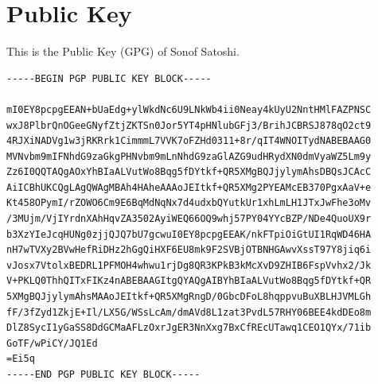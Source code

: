 \documentclass{article}
\begin{document}
\section{Public Key}
This is the Public Key (GPG) of Sonof Satoshi.
\label{gpgkey}
\begin{small}
\begin{verbatim}
-----BEGIN PGP PUBLIC KEY BLOCK-----

mI0EY8pcpgEEAN+bUaEdg+ylWkdNc6U9LNkWb4ii0Neay4kUyU2NntHMlFAZPNSC
wxJ8PlbrQnOGeeGNyfZtjZKTSn0Jor5YT4pHNlubGFj3/BrihJCBRSJ878qO2ct9
4RJXiNADVg1w3jRKRrk1CimmmL7VVK7oFZHd0311+8r/qIT4WNOITydNABEBAAG0
MVNvbm9mIFNhdG9zaGkgPHNvbm9mLnNhdG9zaGlAZG9udHRydXN0dmVyaWZ5Lm9y
Zz6I0QQTAQgAOxYhBIaALVutWo8Bqg5fDYtkf+QR5XMgBQJjylymAhsDBQsJCAcC
AiICBhUKCQgLAgQWAgMBAh4HAheAAAoJEItkf+QR5XMg2PYEAMcEB370PgxAaV+e
Kt458OPymI/rZOWO6Cm9E6BqMdNqNx7d4udxbQYutkUr1xhLmLH1JTxJwFhe3oMv
/3MUjm/VjIYrdnXAhHqvZA3502AyiWEQ66OQ9whj57PY04YYcBZP/NDe4QuoUX9r
b3XzYIeJcqHUNg0zjjQJQ7bU7gcwuI0EY8pcpgEEAK/nkFTpiOiGtUI1RqWD46HA
nH7wTVXy2BVwHefRiDHz2hGgQiHXF6EU8mk9F2SVBjOTBNHGAwvXssT97Y8jiq6i
vJosx7VtolxBEDRL1PFMOH4whwu1rjDg8QR3KPkB3kMcXvD9ZHIB6FspVvhx2/Jk
V+PKLQ0ThhQITxFIKz4nABEBAAGItgQYAQgAIBYhBIaALVutWo8Bqg5fDYtkf+QR
5XMgBQJjylymAhsMAAoJEItkf+QR5XMgRngD/0GbcDFoL8hqppvuBuXBLHJVMLGh
fF/3fZyd1ZkjE+Il/LX5G/WSsLcAm/dmAVd8L1zat3PvdL57RHY06BEE4kdDEo8m
DlZ8SycI1yGaSS8DdGCMaAFLzOxrJgER3NnXxg7BxCfREcUTawq1CEO1QYx/71ib
GoTF/wPiCY/JQ1Ed
=Ei5q
-----END PGP PUBLIC KEY BLOCK-----
\end{verbatim}
\end{small}



  
\end{document}
